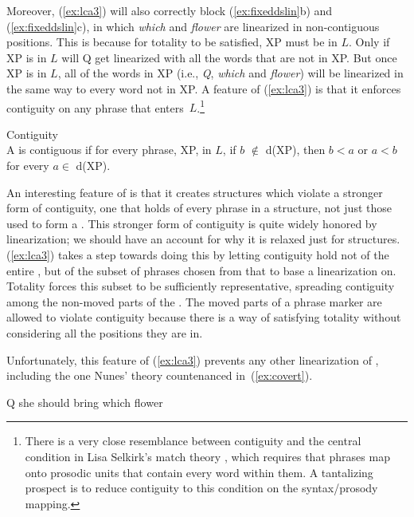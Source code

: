 \documentclass[output=paper]{langsci/langscibook}
\begin{document}
Moreover, (\ref{ex:lca3}) will also correctly block (\ref{ex:fixeddslin}b) and
(\ref{ex:fixeddslin}c), in which \emph{which} and \emph{flower} are linearized
in non-contiguous positions. This is because for totality to be satisfied, XP
must be in $L$. Only if XP is in $L$ will Q get linearized with all the words
that are not in XP. But once XP is in $L$, all of the words in XP (i.e.,
\emph{Q}, \emph{which} and \emph{flower}) will be linearized in the same way to
every word not in XP. A feature of (\ref{ex:lca3}) is that it enforces
contiguity on any phrase that enters~$L$.\footnote{There is a very close
resemblance between contiguity and the central condition in Lisa Selkirk's
match theory \citep{Selkirk2011}, which requires that phrases map onto
prosodic units that contain every word within them. A tantalizing prospect is
to reduce contiguity to this condition on the syntax/prosody mapping.} %
\begin{exe}
	\ex \label{ex:contiguity} Contiguity\\
	A  is contiguous if for every phrase, XP, in $L$, if $b$ $\notin$ d(XP), then $b<a$ or $a<b$ for every $a \in$ d(XP).
\end{exe}

An interesting feature of  is that it creates structures which violate
a stronger form of contiguity, one that holds of every phrase in a structure,
not just those used to form a . This stronger form of contiguity
is quite widely honored by linearization; we should have an account for why it
is relaxed just for  structures. (\ref{ex:lca3}) takes a step towards
doing this by letting contiguity hold not of the entire , but of
the subset of phrases chosen from that  to base a linearization
on. Totality forces this subset to be sufficiently representative, spreading
contiguity among the non-moved parts of the . The moved parts of a
phrase marker are allowed to violate contiguity because there is a way of
satisfying totality without considering all the positions they are in.

Unfortunately, this feature of (\ref{ex:lca3}) prevents any other linearization
of , including the one Nunes' theory countenanced
in~(\ref{ex:covert}).

\begin{exe}
	\ex \label{ex:covert} Q she should bring which flower
\end{exe}
\end{document}
